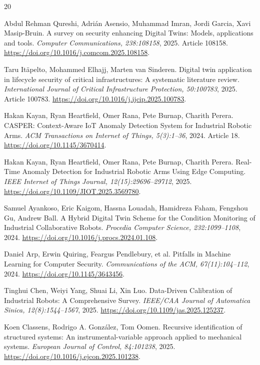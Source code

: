 \begin{thebibliography}{20}

 Abdul Rehman Qureshi, Adrián Asensio, Muhammad Imran, Jordi Garcia, Xavi Masip-Bruin. {A survey on security enhancing Digital Twins: Models, applications and tools}. \emph{Computer Communications, 238:108158}, 2025. Article 108158. \url{https://doi.org/10.1016/j.comcom.2025.108158}.

 Taru Itäpelto, Mohammed Elhajj, Marten van Sinderen. {Digital twin application in lifecycle security of critical infrastructures: A systematic literature review}. \emph{International Journal of Critical Infrastructure Protection, 50:100783}, 2025. Article 100783. \url{https://doi.org/10.1016/j.ijcip.2025.100783}.

 Hakan Kayan, Ryan Heartfield, Omer Rana, Pete Burnap, Charith Perera. {CASPER: Context-Aware IoT Anomaly Detection System for Industrial Robotic Arms}. \emph{ACM Transactions on Internet of Things, 5(3):1--36}, 2024. Article 18. \url{https://doi.org/10.1145/3670414}.

 Hakan Kayan, Ryan Heartfield, Omer Rana, Pete Burnap, Charith Perera. {Real-Time Anomaly Detection for Industrial Robotic Arms Using Edge Computing}. \emph{IEEE Internet of Things Journal, 12(15):29696--29712}, 2025. \url{https://doi.org/10.1109/JIOT.2025.3569780}.

 Samuel Ayankoso, Eric Kaigom, Hassna Louadah, Hamidreza Faham, Fengshou Gu, Andrew Ball. {A Hybrid Digital Twin Scheme for the Condition Monitoring of Industrial Collaborative Robots}. \emph{Procedia Computer Science, 232:1099--1108}, 2024. \url{https://doi.org/10.1016/j.procs.2024.01.108}.

 Daniel Arp, Erwin Quiring, Feargus Pendlebury, et al. {Pitfalls in Machine Learning for Computer Security}. \emph{Communications of the ACM, 67(11):104--112}, 2024. \url{https://doi.org/10.1145/3643456}.

 Tinghui Chen, Weiyi Yang, Shuai Li, Xin Luo. {Data-Driven Calibration of Industrial Robots: A Comprehensive Survey}. \emph{IEEE/CAA Journal of Automatica Sinica, 12(8):1544--1567}, 2025. \url{https://doi.org/10.1109/jas.2025.125237}.

 Koen Classens, Rodrigo A. Gonz{\'a}lez, Tom Oomen. {Recursive identification of structured systems: An instrumental-variable approach applied to mechanical systems}. \emph{European Journal of Control, 84:101238}, 2025. \url{https://doi.org/10.1016/j.ejcon.2025.101238}.


\end{thebibliography}
